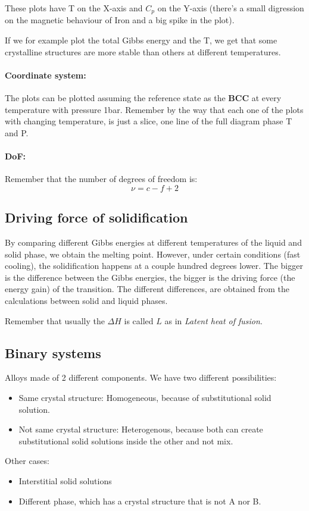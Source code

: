 These plots have T on the X-axis and $C_p$ on the Y-axis (there's a small digression on the magnetic behaviour of Iron and a big spike in the plot).

If we for example plot the total Gibbs energy and the T, we get that some crystalline structures are more stable than others at different temperatures.

\paragraph{Coordinate system:}
The plots can be plotted assuming the reference state as the \textbf{BCC} at every temperature with pressure 1bar. Remember by the way that each one of the plots with changing temperature, is just a slice, one line of the full diagram phase T and P.

\paragraph{DoF:} Remember that the number of degrees of freedom is:
\begin{equation}
    \nu = c - f + 2
\end{equation}

\subsection{Driving force of solidification}

By comparing different Gibbs energies at different temperatures of the liquid and solid phase, we obtain the melting point. However, under certain conditions (fast cooling), the solidification happens at a couple hundred degrees lower. The bigger is the difference between the Gibbs energies, the bigger is the driving force (the energy gain) of the transition. The different differences, are obtained from the calculations between solid and liquid phases.

Remember that usually the $\Delta H$ is called $L$ as in \textit{Latent heat of fusion}.

\subsection{Binary systems}

Alloys made of 2 different components. We have two different possibilities:
\begin{itemize}
    \item Same crystal structure: Homogeneous, because of substitutional solid solution.
    \item Not same crystal structure: Heterogenous, because both can create substitutional solid solutions inside the other and not mix.
\end{itemize}
Other cases:
\begin{itemize}
    \item Interstitial solid solutions
    \item Different phase, which has a crystal structure that is not A nor B.
\end{itemize}

